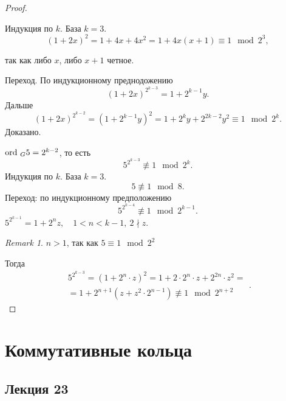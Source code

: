 \documentclass[11pt]{book}
\newcommand{\ord}{{\mathop{\text{\rm ord}}}~}
\theoremstyle{definition}
\theoremstyle{plain}
\theoremstyle{plain}
\theoremstyle{definition}
\theoremstyle{remark}
\newtheorem*{rem}{Remark}
\begin{document}
\begin{proof}
\begin{enumerate}
	    Индукция по $k$. 
	    База $k=3$. \[
		(1 + 2x)^2 = 1 + 4x + 4x^2 = 1 + 4x(x+1) \equiv 1 \mod 2^{3}
	    ,\] 
	    
    \end{enumerate}
так как либо $x$, либо $x+1$ четное.

Переход. По индукционному преднодожению \[
    (1 + 2x)^{2^{k-3}} = 1 + 2^{k-1}y
.\] 
Дальше
\[
    (1+2x)^{2^{k-2}}= (1+2^{k-1}y)^2 = 1 + 2^k y + 2^{2k-2}y^2 \equiv 1 \mod 2^{k}
.\] 
Доказано.

\item $\ord_G 5 = 2^{k-2}$, то есть   \[
5^{2^{k-3}}\not\equiv 1 \mod 2^k
.\] 
Индукция по $k$. База $k = 3$. \[
5 \not\equiv 1\mod 8
.\] 
Переход: по индукционному предположению \[
5^{2^{k-4}}\not\equiv 1 \mod 2^{k-1}
.\] 
$5^{2^{k-1}} = 1 + 2^{n}z, \quad 1 < n < k-1, ~ 2 \nmid z$. 
\begin{rem}
    $n > 1$, так как $5 \equiv 1 \mod 2^{2}$
\end{rem}
Тогда
\[
    \begin{array}{c}
    5^{2^{k-3}} = (1 + 2^{n} \cdot z ) ^2 = 1 + 2\cdot 2^n \cdot z + 2^{2n}\cdot z^{2} = \\
    = 1 + 2^{n+1} ( z + z^2 \cdot 2^{n-1}) \not\equiv 1 \mod 2^{n+2} 
    \end{array}
.\] 
\end{proof}
\chapter{Коммутативные кольца}
\section{Лекция 23}
\end{document}
